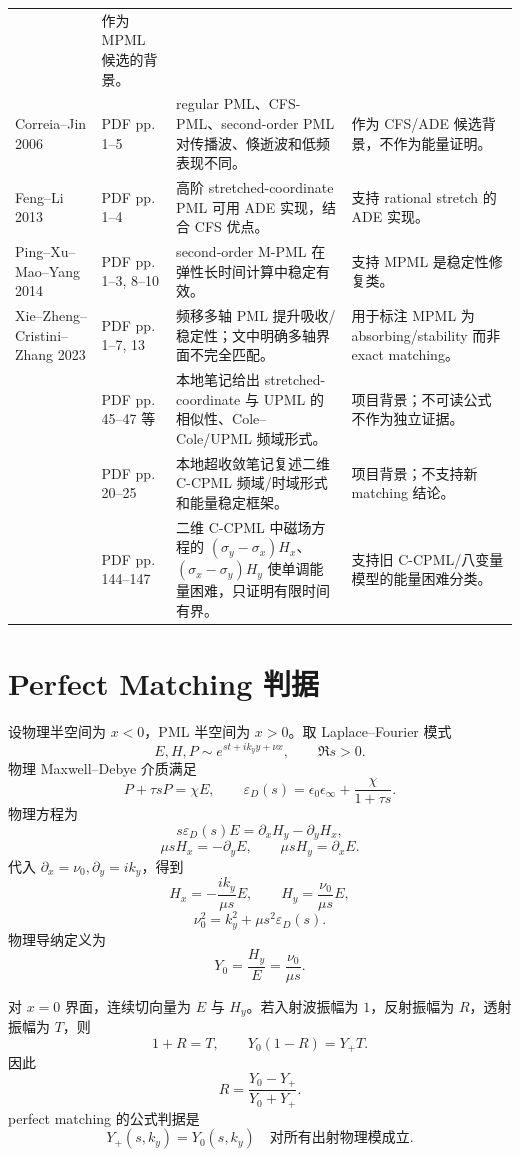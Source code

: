 \documentclass[UTF8,a4paper,11pt]{ctexart}
\newcommand{\eps}{\varepsilon}
\begin{document}
\begin{center}
{\begin{longtable}{@{}L{0.20\textwidth}L{0.14\textwidth}L{0.31\textwidth}L{0.23\textwidth}@{}}
& 作为 MPML 候选的背景。\\
Correia--Jin 2006
& PDF pp. 1--5
& regular PML、CFS-PML、second-order PML 对传播波、倏逝波和低频表现不同。
& 作为 CFS/ADE 候选背景，不作为能量证明。\\
Feng--Li 2013
& PDF pp. 1--4
& 高阶 stretched-coordinate PML 可用 ADE 实现，结合 CFS 优点。
& 支持 rational stretch 的 ADE 实现。\\
Ping--Xu--Mao--Yang 2014
& PDF pp. 1--3, 8--10
& second-order M-PML 在弹性长时间计算中稳定有效。
& 支持 MPML 是稳定性修复类。\\
Xie--Zheng--Cristini--Zhang 2023
& PDF pp. 1--7, 13
& 频移多轴 PML 提升吸收/稳定性；文中明确多轴界面不完全匹配。
& 用于标注 MPML 为 absorbing/stability 而非 exact matching。\\
& PDF pp. 45--47 等
& 本地笔记给出 stretched-coordinate 与 UPML 的相似性、Cole--Cole/UPML 频域形式。
& 项目背景；不可读公式不作为独立证据。\\
& PDF pp. 20--25
& 本地超收敛笔记复述二维 C-CPML 频域/时域形式和能量稳定框架。
& 项目背景；不支持新 matching 结论。\\
& PDF pp. 144--147
& 二维 C-CPML 中磁场方程的 \((\sigma_y-\sigma_x)H_x\)、\((\sigma_x-\sigma_y)H_y\) 使单调能量困难，只证明有限时间有界。
& 支持旧 C-CPML/八变量模型的能量困难分类。\\
\bottomrule
\end{longtable}
}
\end{center}

\section{Perfect Matching 判据}

设物理半空间为 \(x<0\)，PML 半空间为 \(x>0\)。取 Laplace--Fourier 模式
\[
E,H,P\sim e^{st+ik_y y+\nu x},\qquad \Re s>0.
\]
物理 Maxwell--Debye 介质满足
\[
P+\tau sP=\chi E,\qquad
\eps_D(s)=\epsilon_0\epsilon_\infty+\frac{\chi}{1+\tau s}.
\]
物理方程为
\[
s\eps_D(s)E=\partial_xH_y-\partial_yH_x,
\]
\[
\mu sH_x=-\partial_yE,\qquad \mu sH_y=\partial_xE.
\]
代入 \(\partial_x=\nu_0,\partial_y=ik_y\)，得到
\[
H_x=-\frac{ik_y}{\mu s}E,\qquad
H_y=\frac{\nu_0}{\mu s}E,
\]
\[
\nu_0^2=k_y^2+\mu s^2\eps_D(s).
\]
物理导纳定义为
\[
Y_0=\frac{H_y}{E}=\frac{\nu_0}{\mu s}.
\]

对 \(x=0\) 界面，连续切向量为 \(E\) 与 \(H_y\)。若入射波振幅为 \(1\)，反射振幅为 \(R\)，透射振幅为 \(T\)，则
\[
1+R=T,\qquad Y_0(1-R)=Y_+T.
\]
因此
\[
R=\frac{Y_0-Y_+}{Y_0+Y_+}.
\]
perfect matching 的公式判据是
\[
\boxed{Y_+(s,k_y)=Y_0(s,k_y)\quad\text{对所有出射物理模成立}.}
\]
\end{document}
